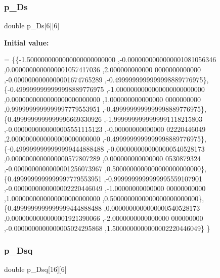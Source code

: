\mbox{\label{a00990_a75dab8f9530af8120d2bf5350308720e}} 
\subsubsection{\texorpdfstring{p\+\_\+\+Ds}{p\_Ds}}
{\footnotesize\ttfamily double p\+\_\+\+Ds\mbox{[}6\mbox{]}\mbox{[}6\mbox{]}}

{\bfseries Initial value\+:}
\begin{DoxyCode}
= \{\{-1.5000000000000000000000000 ,-0.0000000000000001081056346 ,0.0000000000000001057417036 ,2.000000000000
      0000000000000 ,-0.0000000000000001674765289 ,-0.4999999999999998889776975\},
\{-0.4999999999999998889776975 ,-1.0000000000000000000000000 ,0.0000000000000000000000000 ,1.000000000000000
      0000000000 ,0.9999999999999997779553951 ,-0.4999999999999998889776975\},
\{0.4999999999999996669330926 ,-1.9999999999999991118215803 ,-0.0000000000000005551115123 ,-0.00000000000000
      02220446049 ,2.0000000000000000000000000 ,-0.4999999999999998889776975\},
\{-0.4999999999999999444888488 ,-0.0000000000000000540528173 ,0.0000000000000000577807289 ,0.000000000000000
      0530879324 ,-0.0000000000000001256073967 ,0.5000000000000000000000000\},
\{0.4999999999999997779553951 ,-0.9999999999999995559107901 ,-0.0000000000000002220446049 ,-1.00000000000000
      00000000000 ,1.0000000000000000000000000 ,0.5000000000000000000000000\},
\{0.4999999999999999444888488 ,0.0000000000000000540528173 ,0.0000000000000001921390066 ,-2.0000000000000000
      000000000 ,-0.0000000000000005024295868 ,1.5000000000000002220446049\}
\}
\end{DoxyCode}
\mbox{\label{a00990_a44fa5bf465a5f88e50a535fa1b2a5d16}} 
\subsubsection{\texorpdfstring{p\+\_\+\+Dsq}{p\_Dsq}}
{\footnotesize\ttfamily double p\+\_\+\+Dsq\mbox{[}16\mbox{]}\mbox{[}6\mbox{]}}

